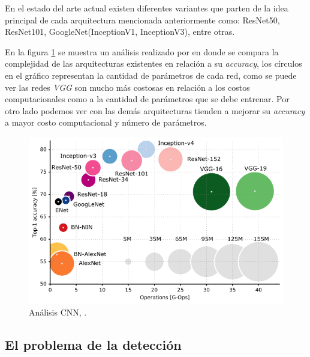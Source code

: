 En el estado del arte actual existen diferentes variantes que parten de la idea principal de cada arquitectura mencionada anteriormente como: ResNet50, ResNet101, GoogleNet(InceptionV1, InceptionV3), entre otras. 

En la  figura \ref{Fig:cnn-analisis} se muestra un análisis realizado por \cite{Analysis_deep_network} en donde se compara la complejidad de las arquitecturas existentes en relación a su \textit{accuracy}, los círculos en el gráfico representan la cantidad de parámetros de cada red, como se puede ver las redes \textit{VGG} son mucho más costosas en relación a los costos computacionales como a la cantidad de parámetros que se debe entrenar. Por otro lado podemos ver con las demás arquitecturas tienden a mejorar su \textit{accuracy} a mayor costo computacional y número de parámetros.

\begin{figure}[H]
 \centering
  \includegraphics[scale=0.5,keepaspectratio=true,clip=true]{imagenes/MarcoTeorico/cnn-analisis.png}
  \caption{Análisis CNN, \citep{cazani_grap}.}\label{Fig:cnn-analisis}
\end{figure}



\subsection{El problema de la detección}\label{sub:problema_deteccion}


